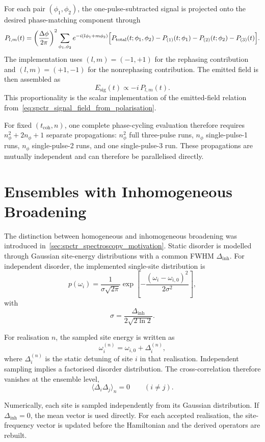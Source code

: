 For each pair \((\phi_1,\phi_2)\), the one-pulse-subtracted signal is projected
onto the desired phase-matching component through
\[
P_{l,m}(t)
=
\left(\frac{\Delta\phi}{2\pi}\right)^2
\sum_{\phi_1,\phi_2}
e^{-i(l\phi_1 + m\phi_2)}
\Bigl[
P_{\mathrm{total}}(t;\phi_1,\phi_2)
- P_{(1)}(t;\phi_1)
- P_{(2)}(t;\phi_2)
- P_{(3)}(t)
\Bigr].
\]
The implementation uses \((l,m)=(-1,+1)\) for the rephasing contribution and
\((l,m)=(+1,-1)\) for the nonrephasing contribution. The emitted field is then
assembled as
\[
E_{\mathrm{sig}}(t) \propto -i\,P_{l,m}(t).
\]
This proportionality is the scalar implementation of the emitted-field relation
from~\autoref{eq:spctr_signal_field_from_polarisation}.

For fixed \((t_{\mathrm{coh}},n)\), one complete phase-cycling evaluation
therefore requires \(n_{\phi}^2 + 2n_{\phi} + 1\) separate propagations:
\(n_{\phi}^2\) full three-pulse runs, \(n_{\phi}\) single-pulse-1 runs,
\(n_{\phi}\) single-pulse-2 runs, and one single-pulse-3 run. These
propagations are mutually independent and can therefore be parallelised
directly.

\section{Ensembles with Inhomogeneous Broadening}
\label{app:sec:inhomogeneous_broadening}

The distinction between homogeneous and inhomogeneous broadening was introduced
in~\cref{sec:spctr_spectroscopy_motivation}. Static disorder is modelled
through Gaussian site-energy distributions with a common FWHM
\(\Delta_{\mathrm{inh}}\). For independent disorder, the implemented
single-site distribution is
\begin{equation}
\label{eq:gaussian_broadening}
p(\omega_i)
=
\frac{1}{\sigma\sqrt{2\pi}}
\exp\!\left[
-\frac{(\omega_i-\omega_{i,0})^2}{2\sigma^2}
\right],
\end{equation}
with
\[
\sigma
=
\frac{\Delta_{\mathrm{inh}}}{2\sqrt{2\ln 2}}.
\]

For realisation \(n\), the sampled site energy is written as
\[
\omega_i^{(n)}=\omega_{i,0}+\Delta_i^{(n)},
\]
where \(\Delta_i^{(n)}\) is the static detuning of site \(i\) in that
realisation. Independent sampling implies a factorised disorder distribution.
The cross-correlation therefore vanishes at the ensemble level,
\[
\langle \Delta_i \Delta_j\rangle_n = 0
\qquad
(i\neq j).
\]

Numerically, each site is sampled independently from its Gaussian
distribution. If \(\Delta_{\mathrm{inh}}=0\), the mean vector is used
directly. For each accepted realisation, the site-frequency vector is updated
before the Hamiltonian and the derived operators are rebuilt.

